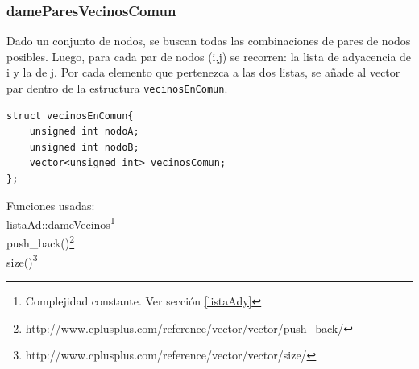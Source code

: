 \subsubsection{dameParesVecinosComun}\label{vec1}

Dado un conjunto de nodos, se buscan todas las combinaciones de pares de nodos posibles. 
Luego, para cada par de nodos (i,j) se recorren: la lista de adyacencia de i y la de j. 
Por cada elemento que pertenezca a las dos listas, se a\~nade al vector par dentro de la estructura \texttt{vecinosEnComun}.


	\begin{codesnippet}
	\begin{verbatim}
struct vecinosEnComun{
    unsigned int nodoA;	
    unsigned int nodoB;
    vector<unsigned int> vecinosComun;
};
	\end{verbatim}
	\end{codesnippet}

\begin{algorithm}[h!]
\end{algorithm}

Funciones usadas:\\
listaAd::dameVecinos\footnote{Complejidad constante. Ver sección \ref{listaAdy}}\\
push_back()\footnote{http://www.cplusplus.com/reference/vector/vector/push_back/}\\
size()\footnote{http://www.cplusplus.com/reference/vector/vector/size/}\\

